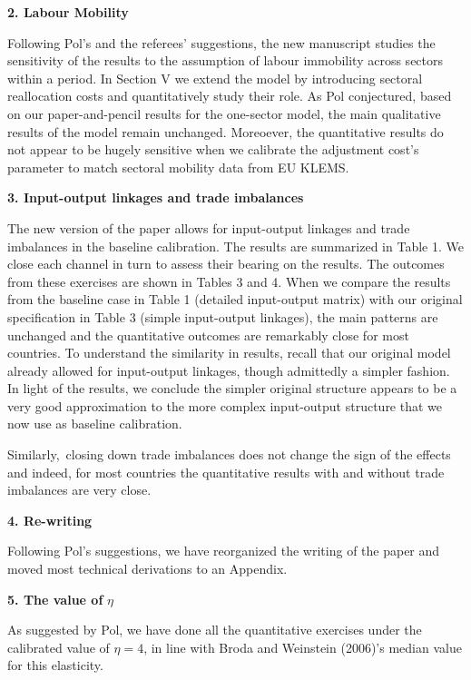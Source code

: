 \documentclass[12pt]{article}
\begin{document}
\bigskip

\textbf{2. Labour Mobility}

Following Pol's and the referees' suggestions, the new manuscript studies
the sensitivity of the results to the assumption of labour immobility across
sectors within a period. In Section V we extend the model by introducing
sectoral reallocation costs and quantitatively study their role. As Pol
conjectured, based on our paper-and-pencil results for the one-sector model,
the main qualitative results of the model remain unchanged. Moreoever, the
quantitative results do not appear to be hugely sensitive when we calibrate
the adjustment cost's parameter to match sectoral mobility data from EU
KLEMS.

\bigskip

\textbf{3. Input-output linkages and trade imbalances}

The new version of the paper allows for input-output linkages and trade
imbalances in the baseline calibration. The results are summarized in Table
1. We close each channel in turn to assess their bearing on the results. The
outcomes from these exercises are shown in Tables 3 and 4. When we compare
the results from the baseline case in Table 1 (detailed input-output matrix)
with our original specification in Table 3 (simple input-output linkages),
the main patterns are unchanged and the quantitative outcomes are remarkably
close for most countries. To understand the similarity in results, recall
that our original model already allowed for input-output linkages, though
admittedly a simpler fashion. In light of the results, we conclude the
simpler original structure appears to be a very good approximation to the
more complex input-output structure that we now use as baseline calibration.

Similarly,\ closing down trade imbalances does not change the sign of the
effects and indeed, for most countries the quantitative results with and
without trade imbalances are very close.\bigskip

\textbf{4. Re-writing}

\bigskip Following Pol's suggestions, we have reorganized the writing of the
paper and moved most technical derivations to an Appendix.

\textbf{5. The value of }$\eta $\textbf{\ }

As suggested by Pol, we have done all the quantitative exercises under the
calibrated value of $\eta =4$, in line with Broda and Weinstein (2006)'s
median value for this elasticity.\bigskip
\end{document}
